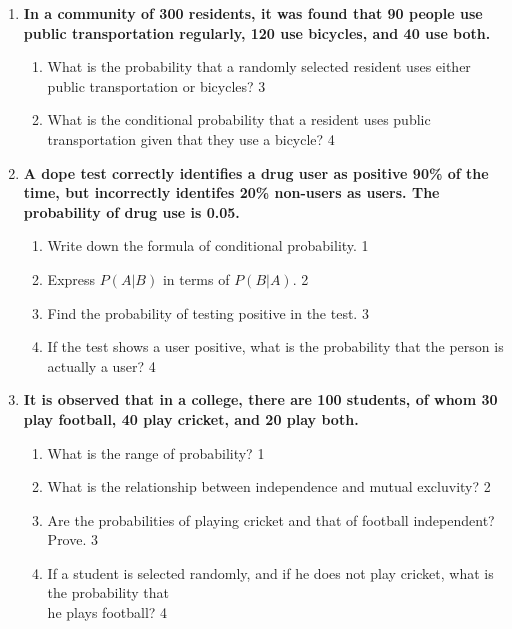 \documentclass[a4paper,oneside, margin=1.4in]{book}
\begin{document}
\begin{enumerate}
\item
  \textbf{In a community of 300 residents, it was found that 90 people use public transportation regularly, 120 use bicycles, and 40 use both.}
 
  \begin{enumerate}
    \item
    	What is the probability that a randomly selected resident uses either public transportation or bicycles? \hfill 3
    \item
    	What is the conditional probability that a resident uses public transportation given that they use a bicycle? \hfill 4
  \end{enumerate}

  
  \item
	  \textbf{A dope test correctly identifies a drug user as positive 90\%  of the time, but incorrectly identifes 20\% non-users as users. The probability of drug use is 0.05.} 
  
  \begin{enumerate}
    \item
	Write down the formula of conditional probability. \hfill 1
    \item
	Express $P(A|B)$ in terms of $P(B|A)$. \hfill 2
    \item  
	Find the probability of testing positive in the test. \hfill 3
    \item
	If the test shows a user positive, what is the probability that the person is actually a user? \hfill 4
  \end{enumerate}
  
  \item
  \textbf{It is observed that in a college, there are 100 students, of whom 30 play football, 40 play cricket, and 20 play both.}
 
  \begin{enumerate}
    \item
	What is the range of probability? \hfill 1
    \item
    	What is the relationship between independence and mutual excluvity?  \hfill 2
    \item
    	Are the probabilities of playing cricket and that of football independent? Prove. \hfill 3
     \item
     	If a student is selected randomly, and if he does not play cricket, what is the probability that \\ he plays football? \hfill 4
  \end{enumerate}
  

\end{enumerate}
\end{document}
